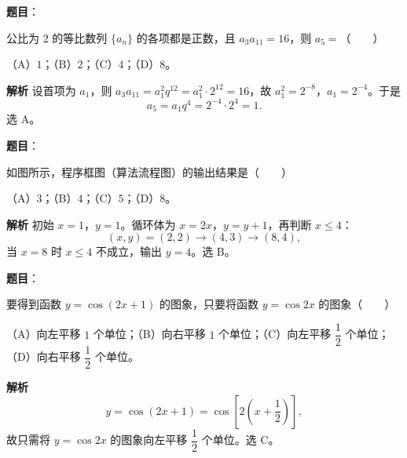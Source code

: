 \begin{answer}

\textbf{题目}：

公比为 $2$ 的等比数列 $\{a_n\}$ 的各项都是正数，且 $a_3a_{11}=16$，则 $a_5=$\mbox{（　　）}

（A）$1$；（B）$2$；（C）$4$；（D）$8$。

\textbf{解析}
设首项为 $a_1$，则 $a_3a_{11}=a_1^2q^{12}=a_1^2\cdot2^{12}=16$，故 $a_1^2=2^{-8}$，$a_1=2^{-4}$。于是
\nopagebreak[4]
\[a_5=a_1q^4=2^{-4}\cdot2^4=1.\]
选 A。


\end{answer}
\begin{answer}

\textbf{题目}：

如图所示，程序框图（算法流程图）的输出结果是\mbox{（　　）}
\nopagebreak[4]
\begin{center}\end{center}
\nopagebreak[4]
（A）$3$；（B）$4$；（C）$5$；（D）$8$。

\textbf{解析}
初始 $x=1$，$y=1$。循环体为 $x=2x$，$y=y+1$，再判断 $x\leqslant4$：
\nopagebreak[4]
\[(x,y)=(2,2)\to(4,3)\to(8,4),\]
当 $x=8$ 时 $x\leqslant4$ 不成立，输出 $y=4$。选 B。


\end{answer}
\begin{answer}

\textbf{题目}：

要得到函数 $y=\cos(2x+1)$ 的图象，只要将函数 $y=\cos2x$ 的图象\mbox{（　　）}

（A）向左平移 $1$ 个单位；（B）向右平移 $1$ 个单位；（C）向左平移 $\dfrac12$ 个单位；（D）向右平移 $\dfrac12$ 个单位。

\textbf{解析}
\nopagebreak[4]
\[y=\cos(2x+1)=\cos\left[2\left(x+\frac12\right)\right],\]
故只需将 $y=\cos2x$ 的图象向左平移 $\dfrac12$ 个单位。选 C。


\end{answer}
